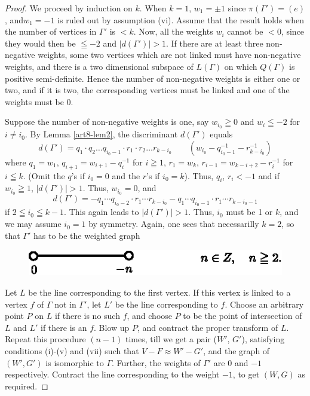 \begin{proof}
We proceed by induction on $k$. When $k=1$, $w_1= \pm 1$ since $\pi (\Gamma') = (e)$, and\pageoriginale $w_1 = -1$ is ruled out by assumption (vi). Assume that the result holds when the number of vertices in $\Gamma'$ is $<k$. Now, all the weights $w_i$ cannot be $<0$, since they would then be $\leqq -2$ and $|d (\Gamma')|>1$. If there are at least three non-negative weights, some two vertices which are not linked must have non-negative weights, and there is a two dimensional subspace of $L(\Gamma)$ on which $Q (\Gamma)$ is positive semi-definite. Hence the number of non-negative weights is either one or two, and if it is two, the corresponding vertices must be linked and one of the weights must be 0.

Suppose the number of non-negative weights is one, say $w_{i_0} \geqq 0$ and $w_i \leqq -2$ for $i \neq i_0$. By Lemma \ref{art8-lem2}, the discriminant $d(\Gamma')$ equals
$$
d (\Gamma') = q_1 \cdot q_2 \ldots q_{i_0-1}\cdot r_1 \cdot r_2 \ldots r_{k-i_0} \qquad (w_{i_0} - q^{-1}_{i_0-1} - r^{-1}_{k-i_0})
$$
where $q_1 = w_1$, $q_{i+1} = w_{i+1} - q^{-1}_{i}$ for $i \geqq 1$, $r_1 = w_k$, $r_{i-1} = w_{k-i+2} - r^{-1}_i$ for $i \leqq k$. (Omit the $q$'s if $i_0 = 0$ and the $r$'s if $i_0=k$). Thus, $q_i$, $r_i < -1$ and if $w_{i_0} \geqq 1$, $|d(\Gamma')|>1$. Thus, $w_{i_0} =0$, and 
$$
d(\Gamma') = - q_1 \cdots q_{i_0-2} \cdot r_1 \cdots r_{k-i_0} - q_1 \cdots q_{i_0-1} \cdot r_1 \cdots r_{k-i_0-1}
$$
if $2\leqq i_0 \leqq k -1$. This again leads to $|d(\Gamma')|>1$. Thus, $i_0$ must be 1 or $k$, and we may assume $i_0=1$ by symmetry. Again, one sees that necessarilly $k=2$, so that $\Gamma'$ has to be the weighted graph
\begin{figure}[H]
\centering
\includegraphics{fig5.eps}
\end{figure}
\noindent
Let $L$ be the line corresponding to the first vertex. If this vertex is linked to a vertex  $f$ of $\Gamma$ not in $\Gamma'$, let $L'$ be the line corresponding to $f$. Choose an arbitrary point $P$ on $L$ if there is no such $f$, and choose $P$ to be the point of intersection of $L$ and $L'$ if there is an $f$. Blow up $P$, and contract the proper transform of $L$. Repeat this procedure $(n-1)$ times, till we get a pair ($W'$, $G'$), satisfying conditions (i)-(v) and (vii) such that $V -F \approx W' - G'$, and the graph of $(W',G')$ is isomorphic to $\Gamma$. Further, the weights of $\Gamma'$ are 0 and $-1$ respectively. Contract the line corresponding to the weight $-1$, to get $(W,G)$ as required.


\end{proof}
